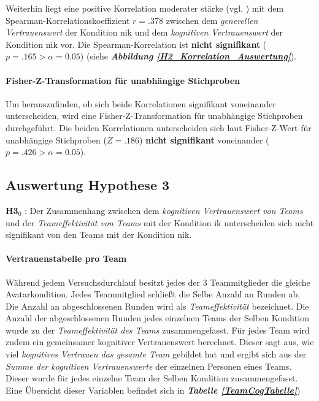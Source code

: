 \documentclass[a4paper,11pt]{article}%
\renewcommand{\\}{\vspace*{0.5\baselineskip} \newline}
\begin{document}
Weiterhin liegt eine positive Korrelation moderater stärke (vgl. \citep{cohen2013statistical}) mit dem Spearman-Korrelationskoeffizient $r = .378$ zwischen dem \textit{generellen Vertrauenswert} der Kondition \ac{nik} und dem \textit{kognitiven Vertrauenswert} der Kondition \ac{nik} vor. Die Spearman-Korrelation ist \textbf{nicht signifikant} ($p = .165 > \alpha = 0.05$) (siehe \textbf{\textit{Abbildung \ref{H2_Korrelation_Auswertung}}}).

\paragraph{Fisher-Z-Transformation für unabhängige Stichproben}
Um herauszufinden, ob sich beide Korrelationen signifikant voneinander unterscheiden, wird eine Fisher-Z-Transformation für unabhängige Stichproben durchgeführt.
Die beiden Korrelationen unterscheiden sich laut Fisher-Z-Wert für unabhängige Stichproben ($Z=.186$) \textbf{nicht signifikant} voneinander ($p = .426 > \alpha = 0.05$).

\newpage
\clearpage
\subsection{Auswertung Hypothese 3}
\textbf{H3$_{0}$} : Der Zusammenhang zwischen dem \textit{kognitiven Vertrauenswert von Teams} und der \textit{Teameffektivität von Teams} mit der Kondition \ac{ik} unterscheiden sich nicht signifikant von den Teams mit der Kondition \ac{nik}.

\paragraph{Vertrauenstabelle pro Team}
Während jedem Versuchsdurchlauf besitzt jedes der 3 Teammitglieder die gleiche Avatarkondition. Jedes Teammitglied schließt die Selbe Anzahl an Runden ab. Die Anzahl an abgeschlossenen Runden wird als \textit{Teameffektivität} bezeichnet. Die Anzahl der abgeschlossenen Runden jedes einzelnen Teams der Selben Kondition wurde zu der \textit{Teameffektivität des Teams} zusammengefasst. 
Für jedes Team wird zudem ein gemeinsamer kognitiver Vertrauenswert berechnet. Dieser sagt aus, wie viel \textit{kognitives Vertrauen das gesamte Team} gebildet hat und ergibt sich aus der \textit{Summe der kognitiven Vertrauenswerte} der einzelnen Personen eines Teams. Dieser wurde für jedes einzelne Team der Selben Kondition zusammengefasst. Eine Übersicht dieser Variablen befindet sich in \textbf{\textit{Tabelle \ref{TeamCogTabelle}}})
\end{document}
